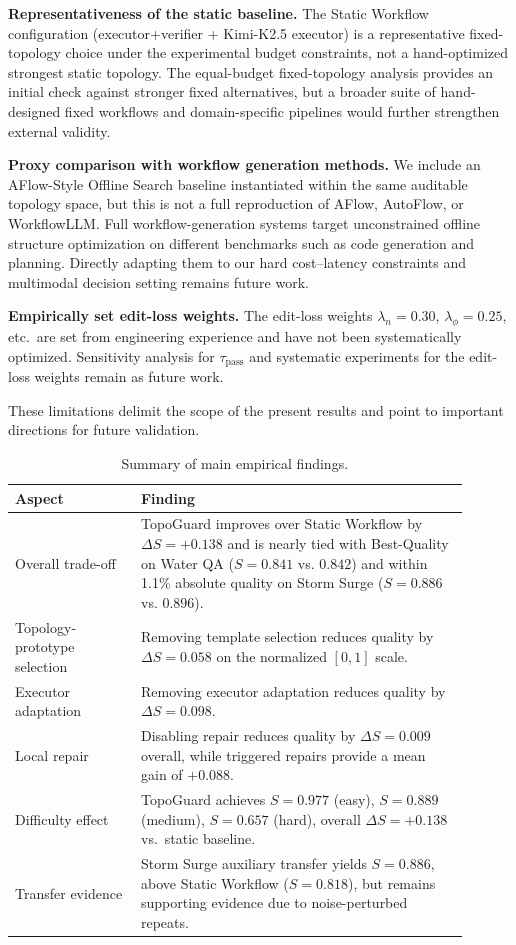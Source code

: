 \documentclass[manuscript,review,anonymous]{acmart}
\begin{document}
\textbf{Representativeness of the static baseline.} The Static Workflow configuration (executor+verifier + Kimi-K2.5 executor) is a representative fixed-topology choice under the experimental budget constraints, not a hand-optimized strongest static topology. The equal-budget fixed-topology analysis provides an initial check against stronger fixed alternatives, but a broader suite of hand-designed fixed workflows and domain-specific pipelines would further strengthen external validity.

\textbf{Proxy comparison with workflow generation methods.} We include an AFlow-Style Offline Search baseline instantiated within the same auditable topology space, but this is not a full reproduction of AFlow, AutoFlow, or WorkflowLLM. Full workflow-generation systems target unconstrained offline structure optimization on different benchmarks such as code generation and planning. Directly adapting them to our hard cost--latency constraints and multimodal decision setting remains future work.

\textbf{Empirically set edit-loss weights.} The edit-loss weights $\lambda_n=0.30$, $\lambda_\phi=0.25$, etc.\ are set from engineering experience and have not been systematically optimized. Sensitivity analysis for $\tau_{\mathrm{pass}}$ and systematic experiments for the edit-loss weights remain as future work.

These limitations delimit the scope of the present results and point to important directions for future validation.


\begin{table}[t]
\centering
\caption{Summary of main empirical findings.}
\label{tab:summary_findings}
\small
\begin{tabular}{p{0.25\linewidth}p{0.65\linewidth}}
\toprule
\textbf{Aspect} & \textbf{Finding} \\
\midrule
Overall trade-off & TopoGuard improves over Static Workflow by $\Delta S=+0.138$ and is nearly tied with Best-Quality on Water QA ($S=0.841$ vs. $0.842$) and within 1.1\% absolute quality on Storm Surge ($S=0.886$ vs. $0.896$). \\
Topology-prototype selection & Removing template selection reduces quality by $\Delta S=0.058$ on the normalized $[0,1]$ scale. \\
Executor adaptation & Removing executor adaptation reduces quality by $\Delta S=0.098$. \\
Local repair & Disabling repair reduces quality by $\Delta S=0.009$ overall, while triggered repairs provide a mean gain of $+0.088$. \\
Difficulty effect & TopoGuard achieves $S=0.977$ (easy), $S=0.889$ (medium), $S=0.657$ (hard), overall $\Delta S=+0.138$ vs.\ static baseline. \\
Transfer evidence & Storm Surge auxiliary transfer yields $S=0.886$, above Static Workflow ($S=0.818$), but remains supporting evidence due to noise-perturbed repeats. \\
\bottomrule
\end{tabular}
\end{table}
\end{document}
